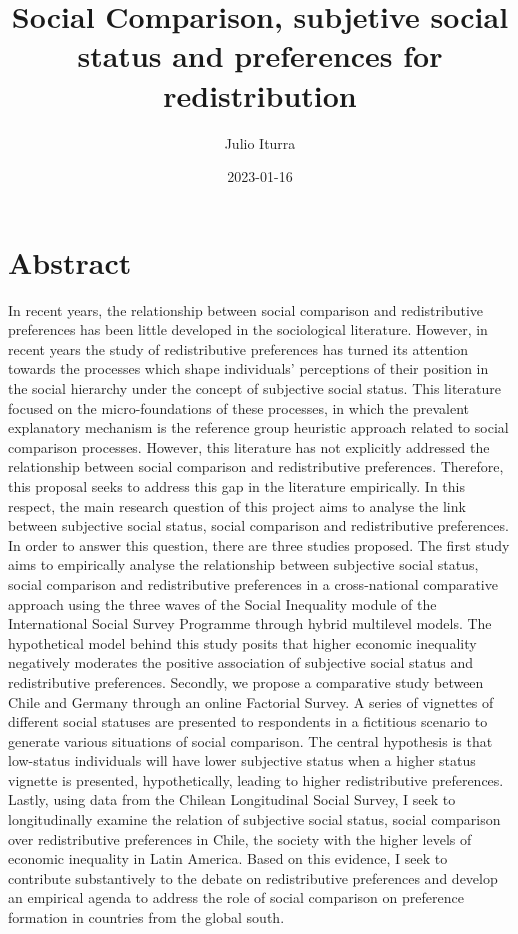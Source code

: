 \documentclass[
  12pt,
]{book}
\title{Social Comparison, subjetive social status and preferences for redistribution}
\author{Julio Iturra}
\date{2023-01-16}
\begin{document}
\maketitle

{
\hypersetup{linkcolor=}
\setcounter{tocdepth}{1}
\tableofcontents
}
\listoffigures
\listoftables
{}
\hypertarget{abstract}{%
\chapter*{Abstract}\label{abstract}}

In recent years, the relationship between social comparison and redistributive preferences has been little developed in the sociological literature. However, in recent years the study of redistributive preferences has turned its attention towards the processes which shape individuals' perceptions of their position in the social hierarchy under the concept of subjective social status. This literature focused on the micro-foundations of these processes, in which the prevalent explanatory mechanism is the reference group heuristic approach related to social comparison processes. However, this literature has not explicitly addressed the relationship between social comparison and redistributive preferences. Therefore, this proposal seeks to address this gap in the literature empirically. In this respect, the main research question of this project aims to analyse the link between subjective social status, social comparison and redistributive preferences. In order to answer this question, there are three studies proposed. The first study aims to empirically analyse the relationship between subjective social status, social comparison and redistributive preferences in a cross-national comparative approach using the three waves of the Social Inequality module of the International Social Survey Programme through hybrid multilevel models. The hypothetical model behind this study posits that higher economic inequality negatively moderates the positive association of subjective social status and redistributive preferences. Secondly, we propose a comparative study between Chile and Germany through an online Factorial Survey. A series of vignettes of different social statuses are presented to respondents in a fictitious scenario to generate various situations of social comparison. The central hypothesis is that low-status individuals will have lower subjective status when a higher status vignette is presented, hypothetically, leading to higher redistributive preferences. Lastly, using data from the Chilean Longitudinal Social Survey, I seek to longitudinally examine the relation of subjective social status, social comparison over redistributive preferences in Chile, the society with the higher levels of economic inequality in Latin America. Based on this evidence, I seek to contribute substantively to the debate on redistributive preferences and develop an empirical agenda to address the role of social comparison on preference formation in countries from the global south.
\end{document}
